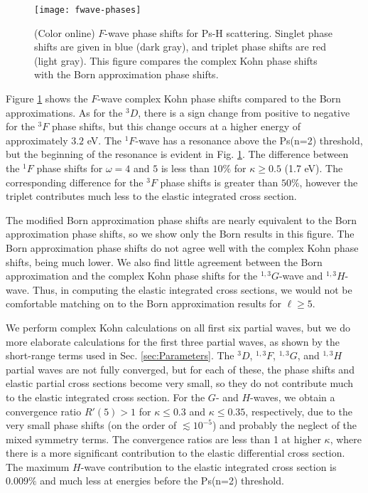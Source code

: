 \documentclass[preprint,showpacs,showkeys,preprintnumbers,amsmath,amssymb,longbibliography,pra,aps]{revtex4-1}
\begin{document}
{\begin{figure}[H]
	\centering
	\texttt{[image: fwave-phases]}
	\caption{(Color online) $F$-wave phase shifts for Ps-H scattering.
Singlet phase shifts are given in blue
(dark gray), and triplet phase shifts are red (light gray). This figure
compares the complex Kohn phase shifts with the Born approximation phase shifts.}
	\label{fig:fwave-phases}
\end{figure}

Figure \ref{fig:fwave-phases} shows the $F$-wave complex Kohn phase shifts 
compared to the Born approximations. As for the $^3D$, there is a sign change 
from positive to negative for the $^3F$ phase shifts, but this change 
occurs at a higher energy of approximately $3.2$ eV. The $^1F$-wave has a 
resonance above the Ps(n=2) threshold, but the beginning of the resonance is 
evident in Fig. \ref{fig:fwave-phases}. The difference between the $^1F$ phase
shifts for $\omega = 4$ and $5$ is less than $10\%$ for $\kappa \geq 0.5$
(1.7 eV). The corresponding difference for the $^3F$ phase shifts is greater
than $50\%$, however the triplet contributes much less to the 
elastic integrated cross section.

The modified Born approximation phase shifts are nearly equivalent to
the Born approximation 
phase shifts, so we show only the Born results in this figure.
The Born approximation phase shifts do
not agree well with the complex Kohn phase shifts, being much lower. We 
also find little agreement between the Born approximation and the complex 
Kohn phase shifts for the $^{1,3}G$-wave and $^{1,3}H$-wave. Thus, in 
computing the elastic integrated cross sections, we would not be comfortable 
matching on to the Born approximation results for $\ell \geq 5$.

We perform complex Kohn calculations on all first six partial waves, but 
we do more elaborate calculations for the first three partial waves, as shown 
by the short-range terms used in Sec. \ref{sec:Parameters}.
The $^3D$, $^{1,3}F$, $^{1,3}G$, and $^{1,3}H$ partial waves are not fully
converged, but for each of these, the phase shifts and elastic partial cross 
sections become very small, so they do not contribute much to the elastic
integrated cross section.
For the $G$- and $H$-waves, we obtain a convergence ratio $R'(5) > 1$ for
$\kappa \leq 0.3$ and $\kappa \leq 0.35$, respectively, due to the very small
phase shifts (on the order of $\lesssim 10^{-5}$) and probably the neglect of
the mixed symmetry terms. The convergence ratios
are less than 1 at higher $\kappa$, where there is a more significant
contribution to the elastic differential cross section.
The maximum $H$-wave contribution to the elastic integrated cross
section is $0.009\%$ and much less at energies before the Ps(n=2)
threshold.

}
\end{document}
